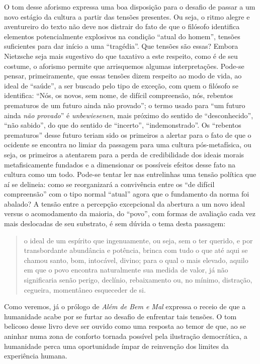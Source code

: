 \documentclass[
	12pt,				%
	openright,			%
	oneside,			%
	a4paper,			%
	english,			%
	french,				%
	spanish,			%
	brazil				%
	]{abntex2}
\begin{document}
O tom desse aforismo expressa uma boa disposição para o desafio de passar a um novo estágio da cultura a partir das tensões presentes. Ou seja, o ritmo alegre e aventureiro do texto não deve nos distrair do fato de que o filósofo identifica elementos potencialmente explosivos na condição “atual do homem”, tensões suficientes para dar início a uma “tragédia”. Que tensões são essas? Embora Nietzsche seja mais sugestivo do que taxativo a este respeito, como é de seu costume, o aforismo permite que arrisquemos algumas interpretações. Pode-se pensar, primeiramente, que essas tensões dizem respeito ao modo de vida, ao ideal de “saúde”, a ser buscado pelo tipo de exceção, com quem o filósofo se identifica: “Nós, os novos, sem nome, de difícil compreensão, nós, rebentos prematuros de um futuro ainda não provado”; o termo usado para “um futuro ainda \textit{não provado}” é \textit{unbewiesenen}, mais próximo do sentido de “desconhecido”, “não sabido”, do que do sentido de “incerto”, “indemonstrado”. Os “rebentos prematuros” desse futuro teriam sido os primeiros a alertar para o fato de que o ocidente se encontra no limiar da passagem para uma cultura pós-metafísica, ou seja, os primeiros a atentarem para a perda de credibilidade dos ideais morais metafisicamente fundados e a dimensionar os possíveis efeitos desse fato na cultura como um todo. Pode-se tentar ler nas entrelinhas uma tensão política que aí se delineia: como se reorganizará a convivência entre os “de difícil compreensão” com o tipo normal “atual” agora que o fundamento da norma foi abalado? A tensão entre a percepção excepcional da abertura a um novo ideal versus o acomodamento da maioria, do “povo”, com formas de avaliação cada vez mais deslocadas de seu substrato, é sem dúvida o tema desta passagem: 

\begin{quotation}
o ideal de um espírito que ingenuamente, ou seja, sem o ter querido, e por transbordante abundância e potência, brinca com tudo o que até aqui se chamou santo, bom, intocável, divino; para o qual o mais elevado, aquilo em que o povo encontra naturalmente sua medida de valor, já não significaria senão perigo, declínio, rebaixamento ou, no mínimo, distração, cegueira, momentâneo esqueceder de si.
\end{quotation}

Como veremos, já o prólogo de \textit{Além de Bem e Mal} expressa o receio de que a humanidade acabe por se furtar ao desafio de enfrentar tais tensões. O tom belicoso desse livro deve ser ouvido como uma resposta ao temor de que, ao se aninhar numa zona de conforto tornada possível pela ilustração democrática, a humanidade perca uma oportunidade ímpar de reinvenção dos limites da experiência humana.
\end{document}
